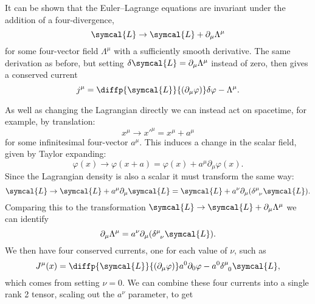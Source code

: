 \documentclass[fleqn]{NotesClass}
\newcommand{\lagrangianDensity}{\symcal{L}}
\begin{document}
    It can be shown that the Euler--Lagrange equations are invariant under the addition of a four-divergence, 
    \begin{equation}
        \lagrangianDensity \to \lagrangianDensity + \partial_\mu \Lambda^\mu
    \end{equation}
    for some four-vector field \(\Lambda^\mu\) with a sufficiently smooth derivative.
    The same derivation as before, but setting \(\delta\lagrangianDensity = \partial_\mu \Lambda^\mu\) instead of zero, then gives a conserved current
    \begin{equation}
        j^\mu = \diffp{\lagrangianDensity}{(\partial_\mu\varphi)} \delta\varphi - \Lambda^\mu.
    \end{equation}
    
    As well as changing the Lagrangian directly we can instead act on spacetime, for example, by translation:
    \begin{equation}
        x^\mu \to x'^\mu = x^\mu + a^\mu
    \end{equation}
    for some infinitesimal four-vector \(a^\mu\).
    This induces a change in the scalar field, given by Taylor expanding:
    \begin{equation}
        \varphi(x) \to \varphi(x + a) = \varphi(x) + a^\mu \partial_\mu \varphi(x).
    \end{equation}
    Since the Lagrangian density is also a scalar it must transform the same way:
    \begin{equation}
        \lagrangianDensity \to \lagrangianDensity + a^\mu \partial_\mu \lagrangianDensity = \lagrangianDensity + a^\nu \partial_\mu (\tensor{\delta}{^\mu_\nu} \lagrangianDensity).
    \end{equation}
    Comparing this to the transformation \(\lagrangianDensity \to \lagrangianDensity + \partial_\mu \Lambda^\mu\) we can identify
    \begin{equation}
        \partial_\mu \Lambda^\mu = a^\nu \partial_\mu (\tensor{\delta}{^\mu_\nu} \lagrangianDensity).
    \end{equation}
    We then have four conserved currents, one for each value of \(\nu\), such as
    \begin{equation}
        J^\mu(x) = \diffp{\lagrangianDensity}{(\partial_\mu \varphi)}a^0\partial_0\varphi - a^0 \tensor{\delta}{^\mu_0}\lagrangianDensity,
    \end{equation}
    which comes from setting \(\nu = 0\).
    We can combine these four currents into a single rank 2 tensor, scaling out the \(a^\nu\) parameter, to get
\end{document}
